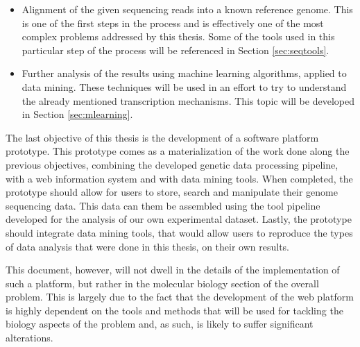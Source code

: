 \begin{itemize}

  \item
  Alignment of the given sequencing reads into a known reference genome. This is
  one of the first steps in the \rnaseq{} process and is effectively one of the
  most complex problems addressed by this thesis. Some of the tools used in this
  particular step of the process will be referenced in Section \ref{sec:seqtools}.

  \item
  Further analysis of the \rnaseq{} results using machine learning algorithms,
  applied to data mining. These techniques will be used in an effort to try to
  understand the already mentioned transcription mechanisms. This topic will be
  developed in Section \ref{sec:mlearning}.

\end{itemize}

The last objective of this thesis is the development of a software platform
prototype. This prototype comes as a materialization of the work done along the
previous objectives, combining the developed genetic data processing pipeline,
with a web information system and with data mining tools. When completed, the
prototype should allow for users to store, search and manipulate their genome
sequencing data. This data can them be assembled using the tool pipeline
developed for the analysis of our own experimental dataset. Lastly, the
prototype should integrate data mining tools, that would allow users to
reproduce the types of data analysis that were done in this thesis, on their own
results.

This document, however, will not dwell in the details of the implementation of
such a platform, but rather in the molecular biology section of the overall
problem. This is largely due to the fact that the development of the web
platform is highly dependent on the tools and methods that will be used for
tackling the biology aspects of the problem and, as such, is likely to suffer
significant alterations.
